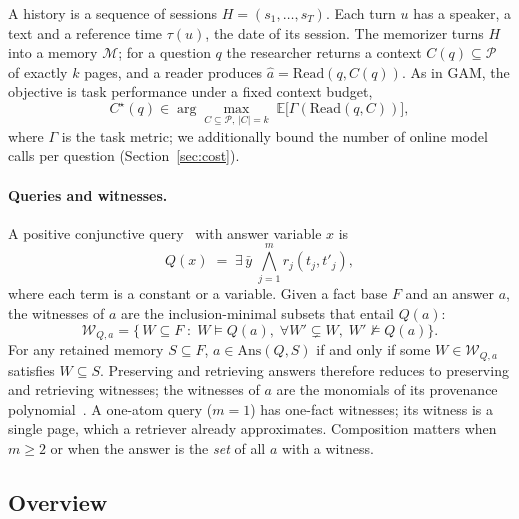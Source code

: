 A history is a sequence of sessions $H=(s_1,\dots,s_T)$. Each turn $u$ has a
speaker, a text and a reference time $\tau(u)$, the date of its session.
The memorizer turns $H$ into a memory $\mathcal{M}$; for a question $q$ the
researcher returns a context $C(q)\subseteq\mathcal{P}$ of exactly $k$ pages,
and a reader produces $\hat a=\mathrm{Read}(q,C(q))$. As in GAM, the objective
is task performance under a fixed context budget,
\begin{equation}
  C^\star(q)\in\arg\max_{C\subseteq\mathcal{P},\,|C|=k}
  \;\mathbb{E}\bigl[\Gamma(\mathrm{Read}(q,C))\bigr],
  \label{eq:objective}
\end{equation}
where $\Gamma$ is the task metric; we additionally bound the number of online
model calls per question (Section~\ref{sec:cost}).

\paragraph{Queries and witnesses.}
A positive conjunctive query~\cite{chandra1977conjunctive} with answer
variable $x$ is
\begin{equation}
  Q(x)\;=\;\exists\,\bar y\;\bigwedge_{j=1}^{m} r_j(t_j, t'_j),
  \label{eq:cq}
\end{equation}
where each term is a constant or a variable. Given a fact base $F$ and an
answer $a$, the witnesses of $a$ are the inclusion-minimal subsets that entail
$Q(a)$:
\begin{equation}
  \mathcal{W}_{Q,a}=\bigl\{\,W\subseteq F \;:\; W\models Q(a),\;
  \forall W'\subsetneq W,\;W'\not\models Q(a)\bigr\}.
  \label{eq:witness}
\end{equation}
For any retained memory $S\subseteq F$, $a\in\mathrm{Ans}(Q,S)$ if and only if
some $W\in\mathcal{W}_{Q,a}$ satisfies $W\subseteq S$. Preserving and retrieving
answers therefore reduces to preserving and retrieving witnesses; the
witnesses of $a$ are the monomials of its provenance
polynomial~\cite{green2007provenance}. A one-atom
query ($m=1$) has one-fact witnesses; its witness is a single page, which a
retriever already approximates. Composition matters when $m\ge2$ or when the
answer is the \emph{set} of all $a$ with a witness.

\subsection{Overview}\label{sec:overview}

